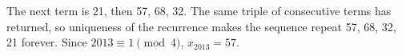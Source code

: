 The next term is 21, then 57, 68, 32. The same triple of consecutive terms has returned, so uniqueness of the recurrence makes the sequence repeat 57, 68, 32, 21 forever. Since $ 2013\equiv1\pmod4 $, $\boxed{x_{2013}=57}$.
